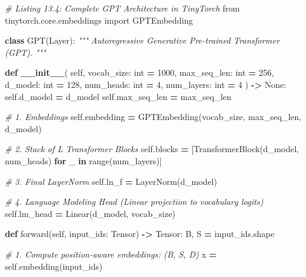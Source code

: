 \documentclass[
  letterpaper,
]{scrbook}
\newenvironment{Shaded}{\begin{snugshade}}{\end{snugshade}}
\newcommand{\BuiltInTok}[1]{#1}
\newcommand{\CommentTok}[1]{\textcolor[rgb]{0.56,0.35,0.01}{\textit{#1}}}
\newcommand{\ControlFlowTok}[1]{\textcolor[rgb]{0.13,0.29,0.53}{\textbf{#1}}}
\newcommand{\DecValTok}[1]{\textcolor[rgb]{0.00,0.00,0.81}{#1}}
\newcommand{\FunctionTok}[1]{\textcolor[rgb]{0.13,0.29,0.53}{\textbf{#1}}}
\newcommand{\ImportTok}[1]{#1}
\newcommand{\KeywordTok}[1]{\textcolor[rgb]{0.13,0.29,0.53}{\textbf{#1}}}
\newcommand{\NormalTok}[1]{#1}
\newcommand{\OperatorTok}[1]{\textcolor[rgb]{0.81,0.36,0.00}{\textbf{#1}}}
\newcommand{\VariableTok}[1]{\textcolor[rgb]{0.00,0.00,0.00}{#1}}
\begin{document}
\begin{Shaded}
\begin{Highlighting}[]
\CommentTok{\# Listing 13.4: Complete GPT Architecture in TinyTorch}
\ImportTok{from}\NormalTok{ tinytorch.core.embeddings }\ImportTok{import}\NormalTok{ GPTEmbedding}

\KeywordTok{class}\NormalTok{ GPT(Layer):}
    \CommentTok{"""}
\CommentTok{    Autoregressive Generative Pre{-}trained Transformer (GPT).}
\CommentTok{    """}

    \KeywordTok{def} \FunctionTok{\_\_init\_\_}\NormalTok{(}
        \VariableTok{self}\NormalTok{,}
\NormalTok{        vocab\_size: }\BuiltInTok{int} \OperatorTok{=} \DecValTok{1000}\NormalTok{,}
\NormalTok{        max\_seq\_len: }\BuiltInTok{int} \OperatorTok{=} \DecValTok{256}\NormalTok{,}
\NormalTok{        d\_model: }\BuiltInTok{int} \OperatorTok{=} \DecValTok{128}\NormalTok{,}
\NormalTok{        num\_heads: }\BuiltInTok{int} \OperatorTok{=} \DecValTok{4}\NormalTok{,}
\NormalTok{        num\_layers: }\BuiltInTok{int} \OperatorTok{=} \DecValTok{4}
\NormalTok{    ) }\OperatorTok{{-}\textgreater{}} \VariableTok{None}\NormalTok{:}
        \VariableTok{self}\NormalTok{.d\_model }\OperatorTok{=}\NormalTok{ d\_model}
        \VariableTok{self}\NormalTok{.max\_seq\_len }\OperatorTok{=}\NormalTok{ max\_seq\_len}

        \CommentTok{\# 1. Embeddings}
        \VariableTok{self}\NormalTok{.embedding }\OperatorTok{=}\NormalTok{ GPTEmbedding(vocab\_size, max\_seq\_len, d\_model)}

        \CommentTok{\# 2. Stack of L Transformer Blocks}
        \VariableTok{self}\NormalTok{.blocks }\OperatorTok{=}\NormalTok{ [TransformerBlock(d\_model, num\_heads) }\ControlFlowTok{for}\NormalTok{ \_ }\KeywordTok{in} \BuiltInTok{range}\NormalTok{(num\_layers)]}

        \CommentTok{\# 3. Final LayerNorm}
        \VariableTok{self}\NormalTok{.ln\_f }\OperatorTok{=}\NormalTok{ LayerNorm(d\_model)}

        \CommentTok{\# 4. Language Modeling Head (Linear projection to vocabulary logits)}
        \VariableTok{self}\NormalTok{.lm\_head }\OperatorTok{=}\NormalTok{ Linear(d\_model, vocab\_size)}

    \KeywordTok{def}\NormalTok{ forward(}\VariableTok{self}\NormalTok{, input\_ids: Tensor) }\OperatorTok{{-}\textgreater{}}\NormalTok{ Tensor:}
\NormalTok{        B, S }\OperatorTok{=}\NormalTok{ input\_ids.shape}

        \CommentTok{\# 1. Compute position{-}aware embeddings: (B, S, D)}
\NormalTok{        x }\OperatorTok{=} \VariableTok{self}\NormalTok{.embedding(input\_ids)}


\end{Highlighting}
\end{Shaded}
\end{document}
